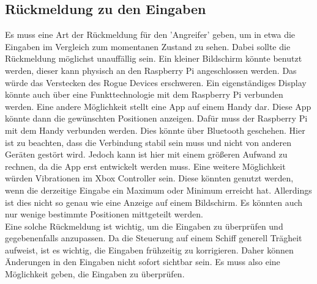 \subsection{Rückmeldung zu den Eingaben}
Es muss eine Art der Rückmeldung für den 'Angreifer' geben, um in etwa die Eingaben im Vergleich zum momentanen Zustand zu sehen.
Dabei sollte die Rückmeldung möglichst unauffällig sein. Ein kleiner Bildschirm könnte benutzt werden, dieser kann 
physisch an den Raspberry Pi angeschlossen werden. Das würde das Verstecken des Rogue Devices erschweren.
Ein eigenständiges Display könnte auch über eine Funkttechnologie mit dem Raspberry Pi verbunden werden.
Eine andere Möglichkeit stellt eine App auf einem Handy dar. Diese App könnte dann die gewünschten Positionen anzeigen.
Dafür muss der Raspberry Pi mit dem Handy verbunden werden. Dies könnte über Bluetooth geschehen.
Hier ist zu beachten, dass die Verbindung stabil sein muss und nicht von anderen Geräten gestört wird.
Jedoch kann ist hier mit einem größeren Aufwand zu rechnen, da die App erst entwickelt werden muss.
Eine weitere Möglichkeit würden Vibrationen im Xbox Controller sein. Diese könnten genutzt werden, wenn die derzeitige
Eingabe ein Maximum oder Minimum erreicht hat. Allerdings ist dies nicht so genau wie eine Anzeige auf einem Bildschirm.
Es könnten auch nur wenige bestimmte Positionen mittgeteilt werden. \\
Eine solche Rückmeldung ist wichtig, um die Eingaben zu überprüfen und gegebenenfalls anzupassen.
Da die Steuerung auf einem Schiff generell Trägheit aufweist, ist es wichtig, die Eingaben frühzeitig zu korrigieren.
Daher können Änderungen in den Eingaben nicht sofort sichtbar sein. Es muss also eine Möglichkeit geben, die Eingaben
zu überprüfen.